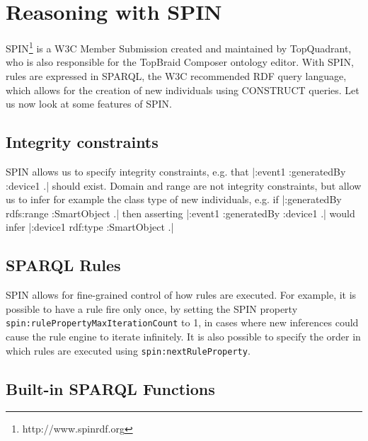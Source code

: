 \section{Reasoning with SPIN}
\label{SPIN}
\ac{SPIN}\footnote{http://www.spinrdf.org} is a W3C Member Submission created and maintained by \mbox{TopQuadrant}, who is also responsible for the TopBraid Composer ontology editor. With \ac{SPIN}, rules are expressed in \ac{SPARQL}, the W3C recommended \ac{RDF} query language, which allows for the creation of new individuals using CONSTRUCT queries. Let us now look at some features of \ac{SPIN}.


\subsection{Integrity constraints}

\ac{SPIN} allows us to specify integrity constraints, e.g. that |:event1 :generatedBy :device1 .| should exist. Domain and range are not integrity constraints, but allow us to infer for example the class type of new individuals, e.g. if |:generatedBy rdfs:range :SmartObject .| then asserting |:event1 :generatedBy :device1 .| would infer |:device1 rdf:type :SmartObject .|




\subsection{SPARQL Rules}


\ac{SPIN} allows for fine-grained control of how rules are executed. For example, it is possible to have a rule fire only once, by setting the SPIN property \texttt{spin:rulePropertyMaxIterationCount} to 1, in cases where new inferences could cause the rule engine to iterate infinitely. It is also possible to specify the order in which rules are executed using \texttt{spin:nextRuleProperty}.


\subsection{Built-in SPARQL Functions}

